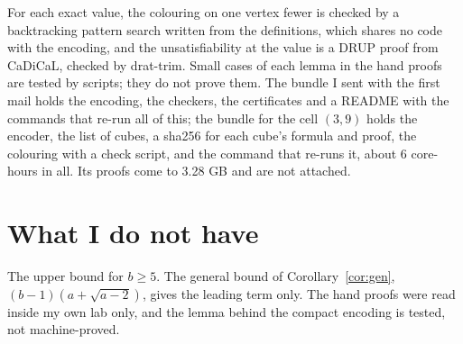 \documentclass[11pt]{article}
\theoremstyle{plain}
\theoremstyle{remark}
\begin{document}
For each exact value, the colouring on one vertex fewer is checked by a backtracking pattern search written from
the definitions, which shares no code with the encoding, and the unsatisfiability at the value is a DRUP proof from
CaDiCaL, checked by drat-trim. Small cases of each lemma in the hand proofs are tested by scripts; they do not prove
them. The bundle I sent with the first mail holds the encoding, the checkers, the certificates and a README with
the commands that re-run all of this; the bundle for the cell $(3,9)$ holds the encoder, the list of cubes, a
sha256 for each cube's formula and proof, the colouring with a check script, and the command that re-runs it,
about 6 core-hours in all. Its proofs come to 3.28 GB and are not attached.

\section{What I do not have}

The upper bound for $b \geq 5$. The general bound of Corollary~\ref{cor:gen}, $(b-1)(a + \sqrt{a-2})$, gives the
leading term only. The hand proofs were read inside my own lab only, and the lemma behind the compact encoding is
tested, not machine-proved.
\end{document}
